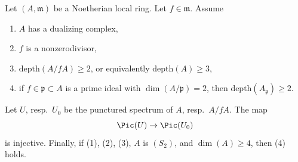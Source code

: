 %

\begin{proposition}[Koll\'ar]
\label{proposition-injective-pic}
\begin{reference}
\cite[Theorem 1.9]{Kollar-map-pic}
\end{reference}
Let $(A, \mathfrak m)$ be a Noetherian local ring. Let $f \in \mathfrak m$.
Assume
\begin{enumerate}
\item $A$ has a dualizing complex,
\item $f$ is a nonzerodivisor,
\item $\text{depth}(A/fA) \geq 2$, or equivalently $\text{depth}(A) \geq 3$,
\item if $f \in \mathfrak p \subset A$ is a prime ideal with
$\dim(A/\mathfrak p) = 2$, then $\text{depth}(A_\mathfrak p) \geq 2$.
\end{enumerate}
Let $U$, resp.\ $U_0$ be the punctured spectrum of $A$, resp.\ $A/fA$. The map
$$
\Pic(U) \to \Pic(U_0)
$$
is injective. Finally, if (1), (2), (3), $A$ is $(S_2)$, and
$\dim(A) \geq 4$, then (4) holds.
\end{proposition}

